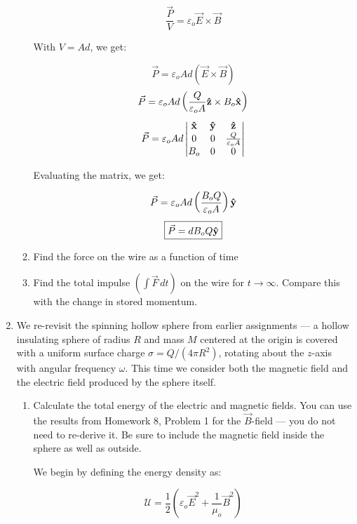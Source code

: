 \begin{enumerate}
\begin{enumerate}
        $$\frac{\vec{P}}{V}=\varepsilon_o\vec{E}\times\vec{B}$$

        With $V=Ad$, we get:

        $$\vec{P}=\varepsilon_oAd\left(\vec{E}\times\vec{B}\right)$$
        $$\vec{P}=\varepsilon_oAd\left(\frac{Q}{\varepsilon_o A}\bold{\hat{z}}\times B_o\bold{\hat{x}}\right)$$
        $$\vec{P}=\varepsilon_oAd\left|\begin{matrix} \bold{\hat{x}} & \bold{\hat{y}} & \bold{\hat{z}}\\ 0 & 0 & \frac{Q}{\varepsilon_o A}\\ B_o & 0 & 0\\ \end{matrix}\right|$$

        Evaluating the matrix, we get:

        $$\vec{P}=\varepsilon_oAd\left( \frac{B_oQ}{\varepsilon_o A} \right)\bold{\hat{y}}$$
        $$\boxed{\vec{P}=dB_oQ\bold{\hat{y}}}$$

      \item Find the force on the wire as a function of time

      \item Find the total impulse $\left( \int\vec{F}\,dt \right)$ on the wire for $t\to\infty$. Compare this with the change in stored momentum.

    \end{enumerate}

  \item We re-revisit the spinning hollow sphere from earlier assignments — a hollow insulating sphere of radius $R$ and mass $M$ centered at the origin is covered with a uniform surface charge $\sigma=Q/(4\pi R^2)$, rotating about the $z$-axis with angular frequency $\omega$. This time we consider both the magnetic field and the electric field produced by the sphere itself.

    \begin{enumerate}

      \item Calculate the total energy of the electric and magnetic fields. You can use the results from Homework 8, Problem 1 for the $\vec{B}$-field — you do not need to re-derive it.  Be sure to include the magnetic field inside the sphere as well as outside.

        We begin by defining the energy density as:

        $$\mathcal{U}=\frac{1}{2}\left( \varepsilon_o\vec{E}^2+\frac{1}{\mu_o}\vec{B}^2\right)$$


\end{enumerate}
\end{enumerate}
